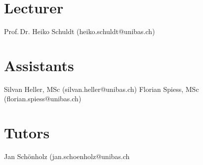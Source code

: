 \documentclass[runningheads,a4paper,table]{llncs}
\newenvironment{produceProceedings}{}{}
\begin{document}
\begin{produceProceedings}
	\section*{Lecturer}
	Prof.\,Dr. Heiko Schuldt (heiko.schuldt@unibas.ch)
	\section*{Assistants}
	Silvan Heller, MSc (silvan.heller@unibas.ch)
	Florian Spiess, MSc (florian.spiess@unibas.ch)
	\section*{Tutors}
	Jan Schönholz (jan.schoenholz@unibas.ch
	\tableofcontents
\end{produceProceedings}
	
%
\mainmatter
%


\end{document}
